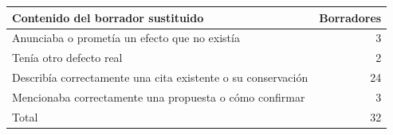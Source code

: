 \begin{tabular}{lr}\toprule
Contenido del borrador sustituido & Borradores \\ \midrule
Anunciaba o prometía un efecto que no existía & 3 \\
Tenía otro defecto real & 2 \\
Describía correctamente una cita existente o su conservación & 24 \\
Mencionaba correctamente una propuesta o cómo confirmar & 3 \\
\midrule Total & 32 \\
\bottomrule\end{tabular}

